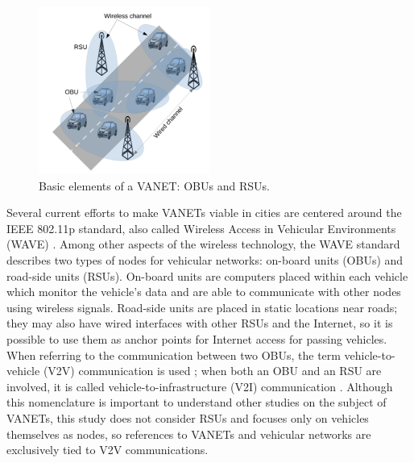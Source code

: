 
\begin{figure}[h]
    \centering
    \includegraphics[width=0.5\textwidth]{images/vanet.png}
    \caption{Basic elements of a VANET: OBUs and RSUs. \cite{saini2015close}}
    \label{fig:vanet}
\end{figure}

Several current efforts to make VANETs viable in cities are centered around the IEEE 802.11p standard, also called Wireless Access in Vehicular Environments (WAVE) \cite{jiang2008ieee}.
Among other aspects of the wireless technology, the WAVE standard describes two types of nodes for vehicular networks: on-board units (OBUs) and road-side units (RSUs).
On-board units are computers placed within each vehicle which monitor the vehicle's data and are able to communicate with other nodes using wireless signals.
Road-side units are placed in static locations near roads; they may also have wired interfaces with other RSUs and the Internet, so it is possible to use them as anchor points for Internet access for passing vehicles.
When referring to the communication between two OBUs, the term vehicle-to-vehicle (V2V) communication is used \cite{yang2004vehicle}; when both an OBU and an RSU are involved, it is called vehicle-to-infrastructure (V2I) communication \cite{chou2009feasibility}.
Although this nomenclature is important to understand other studies on the subject of VANETs, this study does not consider RSUs and focuses only on vehicles themselves as nodes, so references to VANETs and vehicular networks are exclusively tied to V2V communications.

